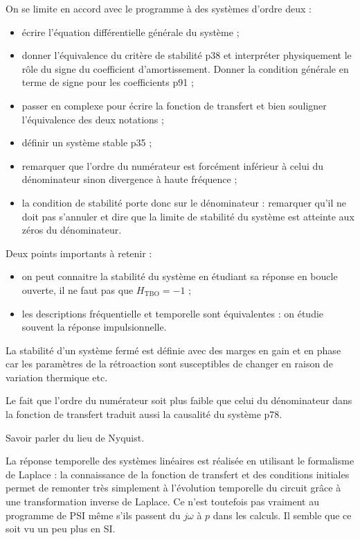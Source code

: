 On se limite en accord avec le programme à des systèmes d'ordre deux :
\begin{itemize}
\item écrire l'équation différentielle générale du système ;\\
\item donner l'équivalence du critère de stabilité \cite{Cardini2017} p38 et interpréter physiquement le rôle du signe du coefficient d'amortissement.
Donner la condition générale en terme de signe pour les coefficients \cite{Neveu2019a} p91 ;
\item passer en complexe pour écrire la fonction de transfert et bien souligner l'équivalence des deux notations ;
\item définir un système stable \cite{Cardini2017} p35 ;
\item remarquer que l'ordre du numérateur est forcément inférieur à celui du dénominateur sinon divergence à haute fréquence ;
\item la condition de stabilité porte donc sur le dénominateur : remarquer qu'il ne doit pas s'annuler et dire que la limite de stabilité du système est atteinte aux zéros du dénominateur.
\end{itemize}
Deux points importants à retenir :
\begin{itemize}
\item on peut connaitre la stabilité du système en étudiant sa réponse en boucle ouverte, il ne faut pas que $H_\mathrm{TBO}=-1$ ;
\item les descriptions fréquentielle et temporelle sont équivalentes : on étudie souvent la réponse impulsionnelle.
\end{itemize}

\begin{remarque}
La stabilité d'un système fermé est définie avec des marges en gain et en phase car les paramètres de la rétroaction sont susceptibles de changer en raison de variation thermique etc.

\noindent
Le fait que l'ordre du numérateur soit plus faible que celui du dénominateur dans la fonction de transfert traduit aussi la causalité du système \cite{Neveu2019a} p78.

\noindent
Savoir parler du lieu de Nyquist.

\noindent
La réponse temporelle des systèmes linéaires est réalisée en utilisant le formalisme de Laplace : la connaissance de la fonction de transfert et des conditions initiales permet de remonter très simplement à l'évolution temporelle du circuit grâce à une transformation inverse de Laplace.
Ce n'est toutefois pas vraiment au programme de PSI même s'ils passent du $j\omega$ à $p$ dans les calculs.
Il semble que ce soit vu un peu plus en SI.
\end{remarque}

